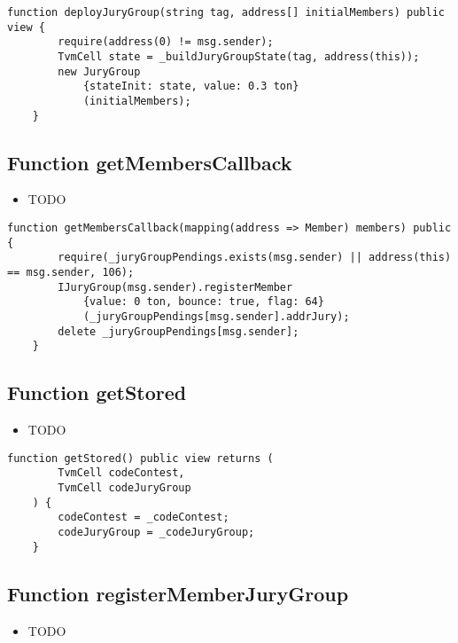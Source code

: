 \begin{lstlisting}[firstnumber=112]
    function deployJuryGroup(string tag, address[] initialMembers) public view {
        require(address(0) != msg.sender);
        TvmCell state = _buildJuryGroupState(tag, address(this));
        new JuryGroup
            {stateInit: state, value: 0.3 ton}
            (initialMembers);
    }
\end{lstlisting}

\subsection{Function getMembersCallback}

\begin{itemize}
\item TODO
\end{itemize}

\begin{lstlisting}[firstnumber=130]
    function getMembersCallback(mapping(address => Member) members) public {
        require(_juryGroupPendings.exists(msg.sender) || address(this) == msg.sender, 106);
        IJuryGroup(msg.sender).registerMember
            {value: 0 ton, bounce: true, flag: 64}
            (_juryGroupPendings[msg.sender].addrJury);
        delete _juryGroupPendings[msg.sender];
    }
\end{lstlisting}

\subsection{Function getStored}

\begin{itemize}
\item TODO
\end{itemize}

\begin{lstlisting}[firstnumber=142]
    function getStored() public view returns (
        TvmCell codeContest,
        TvmCell codeJuryGroup
    ) {
        codeContest = _codeContest;
        codeJuryGroup = _codeJuryGroup;
    }
\end{lstlisting}

\subsection{Function registerMemberJuryGroup}

\begin{itemize}
\item TODO
\end{itemize}

